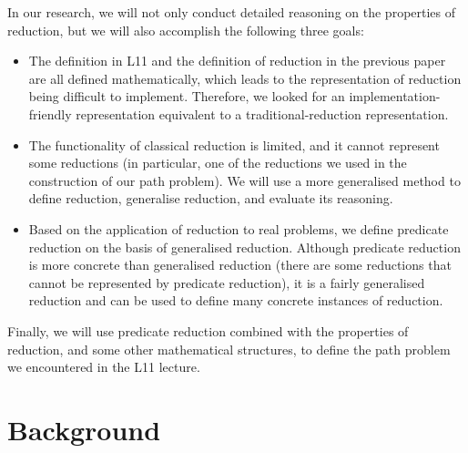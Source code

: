 \documentclass[a4paper,12pt,twoside,openright]{report}
\begin{document}
In our research, we will not only conduct detailed reasoning on the properties of reduction, but we will also accomplish the following three goals:
\begin{itemize}
  \item The definition in L11 and the definition of reduction in the previous paper are all defined mathematically, which leads to the representation of reduction being difficult to implement. Therefore, we looked for an implementation-friendly representation equivalent to a traditional-reduction representation.
  \item The functionality of classical reduction is limited, and it cannot represent some reductions (in particular, one of the reductions we used in the construction of our path problem). We will use a more generalised method to define reduction, generalise reduction, and evaluate its reasoning. 
  \item Based on the application of reduction to real problems, we define predicate reduction on the basis of generalised reduction. Although predicate reduction is more concrete than generalised reduction (there are some reductions that cannot be represented by predicate reduction), it is a fairly generalised reduction and can be used to define many concrete instances of reduction. 
\end{itemize}
Finally, we will use predicate reduction combined with the properties of reduction, and some other mathematical structures, to define the path problem we encountered in the L11 lecture.

\chapter{Background} 

%
\end{document}
